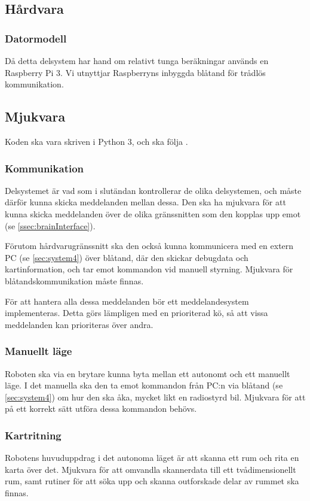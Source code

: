 \documentclass[a4paper,11pt]{article}
\begin{document}
\subsection{Hårdvara}

\subsubsection{Datormodell}
Då detta delsystem har hand om relativt tunga beräkningar används en Raspberry Pi 3. Vi utnyttjar Raspberryns inbyggda blåtand för trådlös kommunikation.

\subsection{Mjukvara}
Koden ska vara skriven i Python 3, och ska följa \cite{pep8}.

\subsubsection{Kommunikation}
Delsystemet är vad som i slutändan kontrollerar de olika delsystemen, och måste därför kunna skicka meddelanden mellan dessa. Den ska ha mjukvara för att kunna skicka meddelanden över de olika gränssnitten som den kopplas upp emot (se \ref{ssec:brainInterface}).

Förutom hårdvarugränssnitt ska den också kunna kommunicera med en extern PC (se \ref{sec:system4}) över blåtand, där den skickar debugdata och kartinformation, och tar emot kommandon vid manuell styrning. Mjukvara för blåtandskommunikation måste finnas.

För att hantera alla dessa meddelanden bör ett meddelandesystem implementeras. Detta görs lämpligen med en prioriterad kö, så att vissa meddelanden kan prioriteras över andra.

\subsubsection{Manuellt läge}
Roboten ska via en brytare kunna byta mellan ett autonomt och ett manuellt läge. I det manuella ska den ta emot kommandon från PC:n via blåtand (se \ref{sec:system4}) om hur den ska åka, mycket likt en radiostyrd bil. Mjukvara för att på ett korrekt sätt utföra dessa kommandon behövs.

\subsubsection{Kartritning}
Robotens huvuduppdrag i det autonoma läget är att skanna ett rum och rita en karta över det. Mjukvara för att omvandla skannerdata till ett tvådimensionellt rum, samt rutiner för att söka upp och skanna outforskade delar av rummet ska finnas.
\end{document}
